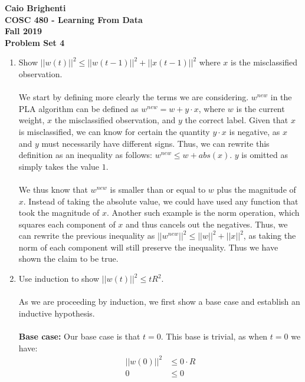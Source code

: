 \documentclass{article}
\begin{document}
\noindent \textbf{Caio Brighenti }\\
\noindent \textbf{COSC 480 - Learning From Data}\\%
\noindent \textbf{Fall 2019}\\%
\noindent \textbf{Problem Set 4}\vspace{1em}\\
\begin{enumerate}
	\item Show $||w(t)||^2 \leq ||w(t-1)||^2 + ||x(t-1)||^2$ where $x$ is the misclassified observation.
	\\\\ We start by defining more clearly the terms we are considering. $w^{new}$ in the PLA algorithm can be defined as $w^{new} = w + y\cdot x$, where $w$ is the current weight, $x$ the misclassified observation, and $y$ the correct label. Given that $x$ is misclassified, we can know for certain the quantity $y \cdot x$ is negative, as $x$ and $y$ must necessarily have different signs. Thus, we can rewrite this definition as an inequality as follows: $w^{new} \leq w + abs(x)$. $y$ is omitted as simply takes the value $1$. 
	\\\\ We thus know that $w^{new}$ is smaller than or equal to $w$ plus the magnitude of $x$.  Instead of taking the absolute value, we could have used any function that took the magnitude of $x$. Another such example is the norm operation, which squares each component of $x$ and thus cancels out the negatives. Thus, we can rewrite the previous inequality as $||w^{new}||^2 \leq ||w||^2 + ||x||^2$, as taking the norm of each component will still preserve the inequality. Thus we have shown the claim to be true.
	\item Use induction to show $||w(t)||^2 \leq tR^2$.
	\\\\ As we are proceeding by induction, we first show a base case and establish an inductive hypothesis.
	\\\\ \textbf{Base case: } Our base case is that $t=0$. This base is trivial, as when $t=0$ we have:
	\begin{align}
	||w(0)||^2 &\leq 0\cdot R \\
	0 &\leq 0
	\end{align}

\end{enumerate}
\end{document}
